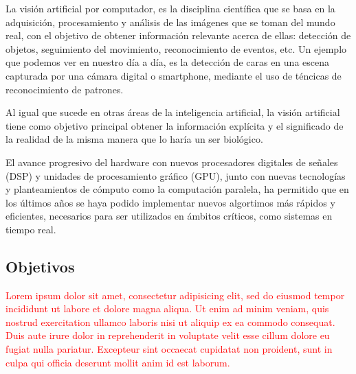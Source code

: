 

La visión artificial por computador, es la disciplina científica que se basa en
la adquisición, procesamiento y análisis de las imágenes que se toman del mundo
real, con el objetivo de obtener información relevante acerca de ellas:
detección de objetos, seguimiento del movimiento, reconocimiento de eventos,
etc. Un ejemplo que podemos ver en nuestro día a día, es la detección de caras
en una escena capturada por una cámara digital o smartphone, mediante el uso de
téncicas de reconocimiento de patrones.

Al igual que sucede en otras áreas de la inteligencia artificial, la visión
artificial tiene como objetivo principal obtener la información explícita y el
significado de la realidad de la misma manera que lo haría un ser biológico.

El avance progresivo del hardware con nuevos procesadores digitales de señales
(DSP) y unidades de procesamiento gráfico (GPU), junto con nuevas tecnologías y
planteamientos de cómputo como la computación paralela, ha permitido que en los
últimos años se haya podido implementar nuevos algortimos más rápidos y
eficientes, necesarios para ser utilizados en ámbitos críticos, como sistemas
en tiempo real.

\subsection{Objetivos}

\textcolor{red}{Lorem ipsum dolor sit amet, consectetur adipisicing elit, sed do
 eiusmod tempor incididunt ut labore et dolore magna aliqua. Ut enim ad minim 
 veniam, quis nostrud exercitation ullamco laboris nisi ut aliquip ex ea commodo 
 consequat. Duis aute irure dolor in reprehenderit in voluptate velit esse cillum
 dolore eu fugiat nulla pariatur. Excepteur sint occaecat cupidatat non proident,
 sunt in culpa qui officia deserunt mollit anim id est laborum.}

